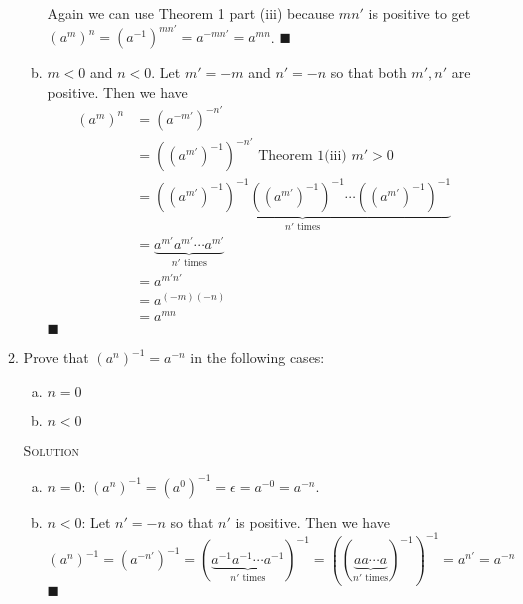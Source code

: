 \documentclass[twoside]{amsart}
\newcommand{\solution}{\textsc{Solution}\xspace}
\newcommand{\blank}{\vspace{5pt}}
\renewcommand{\qed}{\blacksquare}
\begin{document}
\begin{enumerate}[A.]
\begin{enumerate}[1]
\begin{enumerate}[(a)]
         Again we can use Theorem 1 part (iii) because $mn'$ is positive to
         get $(a^m)^n = (a^{-1})^{mn'} = a^{-mn'} = a^{mn}$. $\qed$

         \item $m<0$ and $n<0$. Let $m' = -m$ and $n' = -n$ so that both
         $m', n'$ are positive. Then we have
         \begin{align*} 
            (a^m)^n &= (a^{-m'})^{-n'} \\
                    &= ((a^{m'})^{-1})^{-n'} \text{ Theorem 1(iii) $m'>0$} \\
                    &= \underbrace{((a^{m'})^{-1})^{-1} ((a^{m'})^{-1})^{-1}
                        \cdots ((a^{m'})^{-1})^{-1}}_{n'\text{ times}} \\
                    &= \underbrace{a^{m'} a^{m'} \cdots a^{m'}}_{n'\text{ 
                    times}} \\
                    &= a^{m'n'} \\
                    &= a^{(-m)(-n)} \\
                    &= a^{mn}
         \end{align*}
         $\qed$

      \end{enumerate}

      \blank
      \item Prove that $(a^n)^{-1} = a^{-n}$ in the following cases:
      \begin{enumerate}[(a)]
         \item $n=0$
         \item $n<0$
      \end{enumerate}
      
      \blank \noindent \solution 
      \begin{enumerate}[(a)]
         \item $n=0$: $(a^n)^{-1} = (a^0)^{-1} = \epsilon = a^{-0} = a^{-n}$. 

         \item $n<0$: Let $n' = -n$ so that $n'$ is positive. Then
         we have 
         \[
         (a^n)^{-1} = (a^{-n'})^{-1} = (\underbrace{a^{-1} a^{-1} \cdots
         a^{-1}}_{n' \text{ times}})^{-1} = ((\underbrace{a a \cdots
         a}_{n'\text{ times}})^{-1})^{-1} = a^{n'} = a^{-n}
         \]
         $\qed$

      \end{enumerate}


   \end{enumerate}


\end{enumerate}
\end{document}
